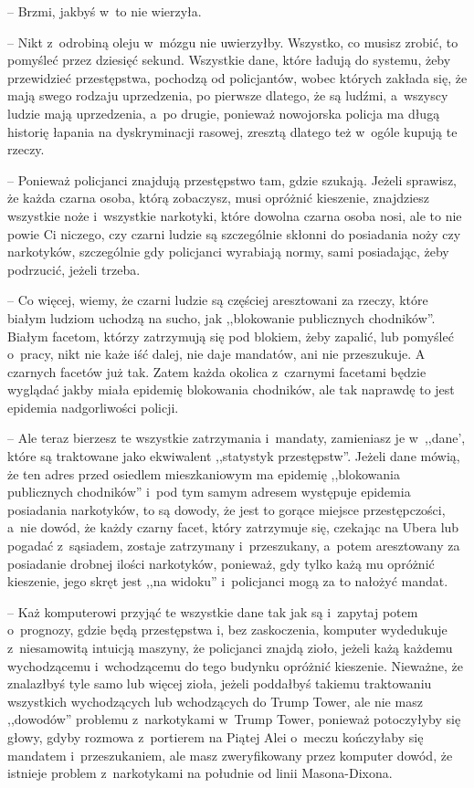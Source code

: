 \documentclass[oneside,polish,11pt,sfheadings]{mwbk}
\begin{document}
-- Brzmi, jakbyś w~to nie wierzyła.

-- Nikt z~odrobiną oleju w~mózgu nie uwierzyłby. Wszystko, co musisz
zrobić, to pomyśleć przez dziesięć sekund. Wszystkie dane, które ładują
do systemu, żeby przewidzieć przestępstwa, pochodzą od policjantów,
wobec których zakłada się, że mają swego rodzaju uprzedzenia, po
pierwsze dlatego, że są ludźmi, a~wszyscy ludzie mają uprzedzenia, a~po
drugie, ponieważ nowojorska policja ma długą historię łapania na
dyskryminacji rasowej, zresztą dlatego też w~ogóle kupują te rzeczy.

-- Ponieważ policjanci znajdują przestępstwo tam, gdzie szukają. Jeżeli
sprawisz, że każda czarna osoba, którą zobaczysz, musi opróżnić
kieszenie, znajdziesz wszystkie noże i~wszystkie narkotyki, które
dowolna czarna osoba nosi, ale to nie powie Ci niczego, czy czarni
ludzie są szczególnie skłonni do posiadania noży czy narkotyków,
szczególnie gdy policjanci wyrabiają normy, sami posiadając, żeby
podrzucić, jeżeli trzeba.

-- Co więcej, wiemy, że czarni ludzie są częściej aresztowani za rzeczy,
które białym ludziom uchodzą na sucho, jak ,,blokowanie publicznych
chodników''. Białym facetom, którzy zatrzymują się pod blokiem, żeby
zapalić, lub pomyśleć o~pracy, nikt nie każe iść dalej, nie daje
mandatów, ani nie przeszukuje. A czarnych facetów już tak. Zatem każda
okolica z~czarnymi facetami będzie wyglądać jakby miała epidemię
blokowania chodników, ale tak naprawdę to jest epidemia nadgorliwości
policji.

-- Ale teraz bierzesz te wszystkie zatrzymania i~mandaty, zamieniasz je w~,,dane', które są traktowane jako ekwiwalent ,,statystyk przestępstw''.
Jeżeli dane mówią, że ten adres przed osiedlem mieszkaniowym ma epidemię
,,blokowania publicznych chodników'' i~pod tym samym adresem występuje
epidemia posiadania narkotyków, to są dowody, że jest to gorące miejsce
przestępczości, a~nie dowód, że każdy czarny facet, który zatrzymuje
się, czekając na Ubera lub pogadać z~sąsiadem, zostaje zatrzymany i~przeszukany, a~potem aresztowany za posiadanie drobnej ilości
narkotyków, ponieważ, gdy tylko każą mu opróżnić kieszenie, jego skręt
jest ,,na widoku'' i~policjanci mogą za to nałożyć mandat.

-- Każ komputerowi przyjąć te wszystkie dane tak jak są i~zapytaj potem o~prognozy, gdzie będą przestępstwa i, bez zaskoczenia, komputer
wydedukuje z~niesamowitą intuicją maszyny, że policjanci znajdą zioło,
jeżeli każą każdemu wychodzącemu i~wchodzącemu do tego budynku opróżnić
kieszenie. Nieważne, że znalazłbyś tyle samo lub więcej zioła, jeżeli
poddałbyś takiemu traktowaniu wszystkich wychodzących lub wchodzących do
Trump Tower, ale nie masz ,,dowodów'' problemu z~narkotykami w~Trump
Tower, ponieważ potoczyłyby się głowy, gdyby rozmowa z~portierem na
Piątej Alei o~meczu kończyłaby się mandatem i~przeszukaniem, ale masz
zweryfikowany przez komputer dowód, że istnieje problem z~narkotykami na
południe od linii Masona-Dixona.
\end{document}
